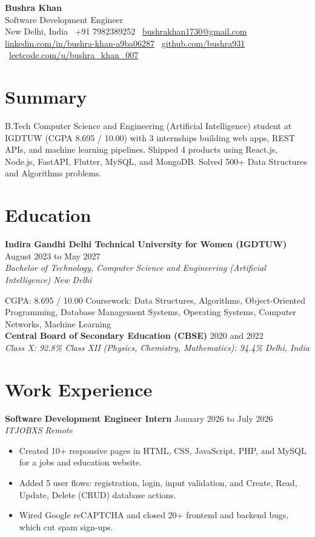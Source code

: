 \documentclass[a4paper,10pt]{article}
\newcommand{\entry}[4]{%
  \vspace{3pt}%
  \noindent\textbf{#1} \hfill #2\\[0.4pt]
  \textit{#3} \hfill \textit{#4}\par
  \vspace{1pt}%
}
\begin{document}
\small

\begin{center}
  {\LARGE\bfseries Bushra Khan}\\[4pt]
  Software Development Engineer\\[4pt]
  New Delhi, India \textbar\ +91 7982389252 \textbar\
  \href{mailto:bushrakhan1730@gmail.com}{bushrakhan1730@gmail.com}\\[2pt]
  \href{https://www.linkedin.com/in/bushra-khan-a9ba06287/}{linkedin.com/in/bushra-khan-a9ba06287} \textbar\
  \href{https://github.com/bushra931}{github.com/bushra931} \textbar\
  \href{https://leetcode.com/u/bushra_khan_007/}{leetcode.com/u/bushra\_khan\_007}
\end{center}

\section{Summary}
B.Tech Computer Science and Engineering (Artificial Intelligence) student at IGDTUW (CGPA 8.695 / 10.00) with 3 internships building web apps, REST APIs, and machine learning pipelines. Shipped 4 products using React.js, Node.js, FastAPI, Flutter, MySQL, and MongoDB. Solved 500+ Data Structures and Algorithms problems.

\section{Education}
\entry{Indira Gandhi Delhi Technical University for Women (IGDTUW)}{August 2023 to May 2027}
{Bachelor of Technology, Computer Science and Engineering (Artificial Intelligence)}{New Delhi}
\noindent CGPA: 8.695 / 10.00 \quad Coursework: Data Structures, Algorithms, Object-Oriented Programming, Database Management Systems, Operating Systems, Computer Networks, Machine Learning\\[3pt]
\noindent\textbf{Central Board of Secondary Education (CBSE)} \hfill 2020 and 2022\\[0.4pt]
\textit{Class X: 92.8\% \quad Class XII (Physics, Chemistry, Mathematics): 94.4\%} \hfill \textit{Delhi, India}

\section{Work Experience}
\entry{Software Development Engineer Intern}{January 2026 to July 2026}
{ITJOBXS}{Remote}
\begin{itemize}
  \item Created 10+ responsive pages in HTML, CSS, JavaScript, PHP, and MySQL for a jobs and education website.
  \item Added 5 user flows: registration, login, input validation, and Create, Read, Update, Delete (CRUD) database actions.
  \item Wired Google reCAPTCHA and closed 20+ frontend and backend bugs, which cut spam sign-ups.
\end{itemize}
\end{document}
